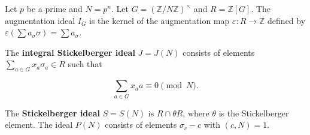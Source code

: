 Let $p$ be a prime and $N = p^n$. Let $G = (\mathbb{Z}/N\mathbb{Z})^\times$ and
$R = \mathbb{Z}[G]$. The augmentation ideal $I_G$ is the kernel of the augmentation
map $\varepsilon: R \to \mathbb{Z}$ defined by $\varepsilon(\sum a_\sigma \sigma) = \sum a_\sigma$.

The \textbf{integral Stickelberger ideal} $J = J(N)$ consists of elements
$\sum_{a \in G} x_a \sigma_a \in R$ such that

$$\sum_{a \in G} x_a a \equiv 0 \pmod{N}.$$

The \textbf{Stickelberger ideal} $S = S(N)$ is $R \cap \theta R$, where $\theta$ is the
Stickelberger element. The ideal $P(N)$ consists of elements $\sigma_c - c$ with
$(c, N) = 1$.
